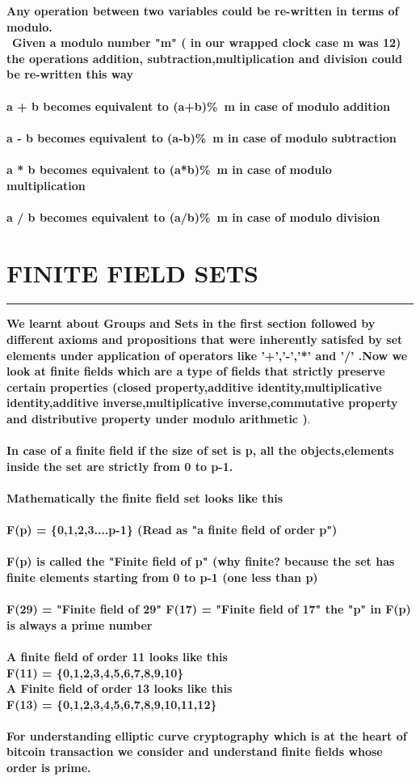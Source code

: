\documentclass{article}
\begin{document}
\textbf {Any operation between two variables could be re-written in terms of modulo.}
\\
\
\textbf{Given a modulo number "m" ( in our wrapped clock case m was 12) the operations addition, subtraction,multiplication and division could be re-written this way}
\\
\\
\textbf{ a + b  becomes equivalent to (a+b)\%\ m in case of modulo addition}
\\
\\
\textbf { a - b becomes equivalent to (a-b)\%\ m in case of modulo subtraction }
\\
\\
\textbf { a * b becomes equivalent to (a*b)\%\ m in case of modulo multiplication}
\\
\\
\textbf { a / b becomes equivalent to (a/b)\%\ m in case of modulo division }

\pagebreak 
\section * {FINITE FIELD SETS}
\hrule
\bigskip
\textbf{ We learnt about Groups and Sets  in the  first section followed by different axioms and propositions that were inherently satisfed by  set elements under application of operators like '+','-','*' and '/' .Now we look at finite fields which are a type of fields that strictly preserve certain  properties (closed property,additive identity,multiplicative identity,additive inverse,multiplicative inverse,commutative property and distributive property under modulo arithmetic  )}.
\\
\\
\textbf{ In case of a finite field if the size of set is p, all the objects,elements inside the set are strictly from 0 to p-1.\\ \\ Mathematically the finite field set looks like this \\ \\
F(p) = \{0,1,2,3....p-1\} (Read as "a finite field of order  p")
\\ \\
F(p) is called the "Finite field of p" (why finite? because the set has finite elements starting from 0 to p-1 (one less than p)
\\\\ 
F(29) = "Finite field of 29"
F(17) = "Finite field of 17"
the "p" in F(p) is always a prime number 
\\ \\
A finite field of order 11 looks like this \\
F(11) = \{0,1,2,3,4,5,6,7,8,9,10\} \\
A Finite field of order 13 looks like this \\
F(13) = \{0,1,2,3,4,5,6,7,8,9,10,11,12\}
\\
\\
For understanding elliptic curve cryptography which is at the heart of bitcoin transaction we consider and understand finite fields whose order is prime.
}
\pagebreak 
\end{document}
